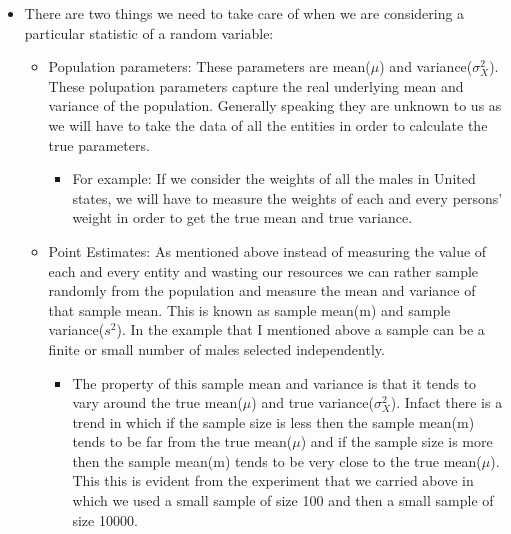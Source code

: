 \documentclass[11pt]{article}
\providecommand{\tightlist}{%
      \setlength{\itemsep}{0pt}\setlength{\parskip}{0pt}}
\begin{document}
    \begin{itemize}
\tightlist
\item
  There are two things we need to take care of when we are considering a
  particular statistic of a random variable:

  \begin{itemize}
  \item
    Population parameters: These parameters are mean(\(\mu\)) and
    variance(\(\sigma_X^2\)). These polupation parameters capture the
    real underlying mean and variance of the population. Generally
    speaking they are unknown to us as we will have to take the data of
    all the entities in order to calculate the true parameters.

    \begin{itemize}
    \tightlist
    \item
      For example: If we consider the weights of all the males in United
      states, we will have to measure the weights of each and every
      persons' weight in order to get the true mean and true variance.
    \end{itemize}
  \item
    Point Estimates: As mentioned above instead of measuring the value
    of each and every entity and wasting our resources we can rather
    sample randomly from the population and measure the mean and
    variance of that sample mean. This is known as sample mean(m) and
    sample variance(\(s^2\)). In the example that I mentioned above a
    sample can be a finite or small number of males selected
    independently.

    \begin{itemize}
    \tightlist
    \item
      The property of this sample mean and variance is that it tends to
      vary around the true mean(\(\mu\)) and true
      variance(\(\sigma_X^2\)). Infact there is a trend in which if the
      sample size is less then the sample mean(m) tends to be far from
      the true mean(\(\mu\)) and if the sample size is more then the
      sample mean(m) tends to be very close to the true mean(\(\mu\)).
      This this is evident from the experiment that we carried above in
      which we used a small sample of size 100 and then a small sample
      of size 10000.
    \end{itemize}
  \end{itemize}
\end{itemize}
\end{document}
